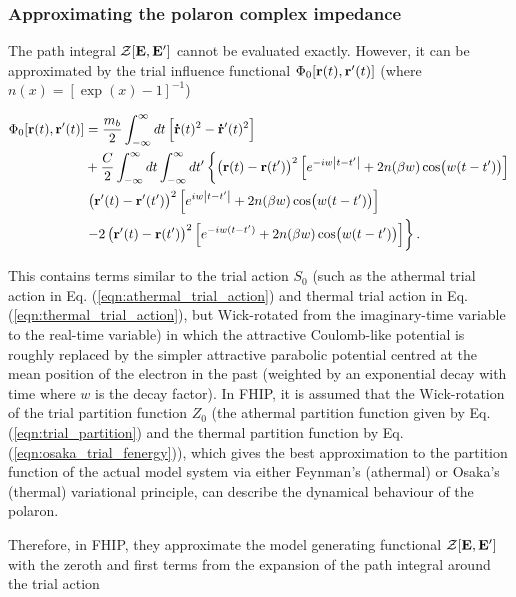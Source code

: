 \subsubsection{Approximating the polaron complex impedance}
\label{subsubsec:2-3-1-1}

The path integral $\mathcal{Z}[\vb{E}, \vb{E'}]$ cannot be evaluated exactly. However, it can be approximated by the trial influence functional $\Phi_0[\vb{r}(t), \vb{r'}(t)]$ (where $n(x) = [\exp(x) - 1]^{-1}$)

\begin{equation}
    \begin{aligned}
    \Phi_0[\vb{r}(t), \vb{r'}(t)] &= \frac{m_b}{2} \int^{\infty}_{-\infty} dt  \left[ \vb{\dot{r}}(t)^2 - \vb{\dot{r}'}(t)^2 \right] \\
    &+ \frac{C}{2} \int^{\infty}_{-\infty} dt \int^{\infty}_{-\infty} dt' \left\{  \left(\vb{r}(t) - \vb{r}(t')\right)^2\left[e^{-iw\abs{t-t'}} + 2n(\beta w) \cos(w(t-t')) \right] \right. \\
    &\left. \left(\vb{r'}(t) - \vb{r'}(t')\right)^2\left[e^{iw\abs{t-t'}} + 2n(\beta w) \cos(w(t-t')) \right]  \right. \\
    &\left. - 2 \left(\vb{r'}(t) - \vb{r}(t')\right)^2\left[e^{-iw(t-t')} + 2n(\beta w) \cos(w(t-t')) \right] \right\}.
    \end{aligned}
\end{equation}

This contains terms similar to the trial action $S_0$ (such as the athermal trial action in Eq. (\ref{eqn:athermal_trial_action}) and thermal trial action in Eq. (\ref{eqn:thermal_trial_action}), but Wick-rotated from the imaginary-time variable to the real-time variable) in which the attractive Coulomb-like potential is roughly replaced by the simpler attractive parabolic potential centred at the mean position of the electron in the past (weighted by an exponential decay with time where $w$ is the decay factor). In FHIP, it is assumed that the Wick-rotation of the trial partition function $Z_0$ (the athermal partition function given by Eq. (\ref{eqn:trial_partition}) and the thermal partition function by Eq. (\ref{eqn:osaka_trial_fenergy})), which gives the best approximation to the partition function of the actual model system via either Feynman's (athermal) or Osaka's (thermal) variational principle, can describe the dynamical behaviour of the polaron. 

Therefore, in FHIP, they approximate the model generating functional $\mathcal{Z[\vb{E}, \vb{E'}]}$ with the zeroth and first terms from the expansion of the path integral around the trial action

